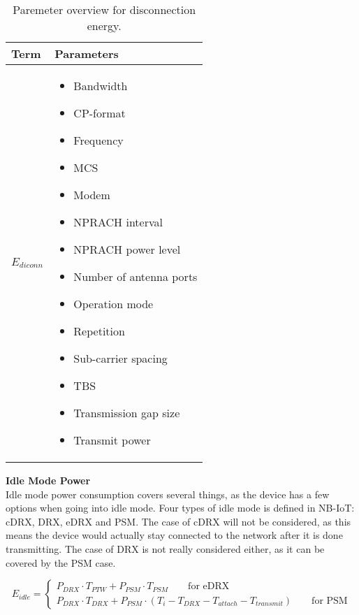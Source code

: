 \begin{table}[H]
\centering
\begin{tabular}{|m{3cm}|m{6cm}|} \hline
\textbf{Term} & \textbf{Parameters} \\ \hline
$E_{diconn}$ & \begin{itemize}
\item Bandwidth
\item \gls{CP}-format
\item Frequency
\item \gls{MCS}
\item Modem 
\item NPRACH interval
\item NPRACH power level
\item Number of antenna ports
\item Operation mode
\item Repetition
\item Sub-carrier spacing
\item \gls{TBS}
\item Transmission gap size
\item Transmit power
\end{itemize} \\ \hline
\end{tabular}
\caption{Paremeter overview for disconnection energy.}
\label{tab:Erelease_parameter_overview}
\end{table}

\textbf{Idle Mode Power}\\
Idle mode power consumption covers several things, as the device has a few options when going into idle mode. Four types of idle mode is defined in \gls{NB-IoT}: \gls{cDRX}, \gls{DRX}, \gls{eDRX} and \gls{PSM}. The case of cDRX will not be considered, as this means the device would actually stay connected to the network after it is done transmitting. The case of DRX is not really considered either, as it can be covered by the PSM case. 
  
\begin{equation}
E_{idle} = \begin{cases} P_{DRX}\cdot T_{PTW}+P_{PSM}\cdot T_{PSM} \qquad \text{for eDRX}\\
             P_{DRX}\cdot T_{DRX} + P_{PSM}\cdot (T_i-T_{DRX}-T_{attach}-T_{transmit}) \qquad \text{for PSM}
           \end{cases}
\end{equation}
\begin{where}
\end{where}

